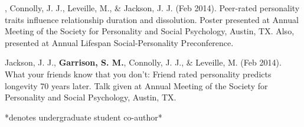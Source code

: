 \item\meb, Connolly, J. J., Leveille, M., \& Jackson, J. J. (Feb 2014). Peer-rated personality traits influence relationship duration and dissolution. Poster presented at Annual Meeting of the Society for Personality and Social Psychology, Austin, TX. Also, presented at Annual Lifespan Social-Personality Preconference.
\item Jackson, J. J., \textbf{Garrison, S. M.}, Connolly, J. J., \& Leveille, M. (Feb 2014). What your friends know that you don't: Friend rated personality predicts longevity 70 years later. Talk given at Annual Meeting of the Society for Personality and Social Psychology, Austin, TX.

\vspace{-2mm}\begin{center}\footnotesize{*denotes undergraduate student co-author*}\end{center} \vspace{-3mm}


